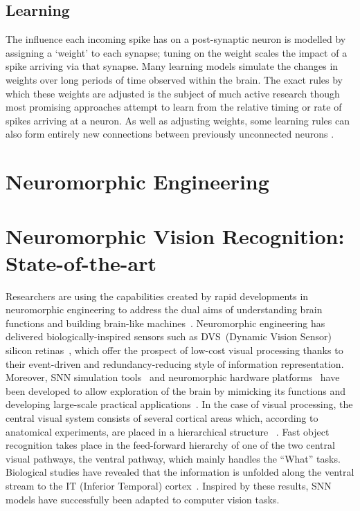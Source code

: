 \subsection{Learning}
The influence each incoming spike has on a post-synaptic neuron is modelled by assigning a `weight' to each synapse;
tuning on the weight scales the impact of a spike
arriving via that synapse.
Many learning models simulate the changes in weights over long periods of time observed within the brain.
The exact rules by which these weights are adjusted is the subject of much active research though most promising approaches attempt to learn from the relative timing \cite{pfister2006triplets} or rate \cite{bienenstock1982theory} of spikes arriving at a neuron.
As well as adjusting weights, some learning rules can also form entirely new connections between previously unconnected
neurons \cite{bamford2010synaptic}.

\section{Neuromorphic Engineering}
\label{sec:morph}

\section{Neuromorphic Vision Recognition: State-of-the-art}
\label{sec:orec}
Researchers are using the capabilities created by rapid developments in neuromorphic engineering to address the dual aims of understanding brain functions and building brain-like machines~\cite{furber2007neural}.
Neuromorphic engineering has delivered biologically-inspired sensors such as DVS~(Dynamic Vision Sensor) silicon retinas~\cite{serrano2013128, delbruck2008frame, yang2015dynamic, posch2014retinomorphic}, which offer the prospect of low-cost visual processing thanks to their event-driven and redundancy-reducing style of information representation.
Moreover, SNN simulation tools~\cite{davison2008pynn, gewaltig2007nest, goodman2008brian} and neuromorphic hardware platforms~\cite{furber2014spinnaker,  schemmel2010wafer,benjamin2014neurogrid,merolla2014million} have been developed to allow exploration of the brain by mimicking its functions and developing large-scale practical applications~\cite{eliasmith2012large}.
In the case of visual processing, the central visual system consists of several cortical areas which, according to anatomical experiments, are placed in a hierarchical structure ~\cite{felleman1991distributed}.
Fast object recognition takes place in the feed-forward hierarchy of one of the two central visual pathways, the ventral pathway, which mainly handles the ``What'' tasks.
Biological studies have revealed that the information is unfolded along the ventral stream to the IT (Inferior Temporal) cortex~\cite{dicarlo2012does}.
Inspired by these results, SNN models have successfully been adapted to computer vision tasks.  

